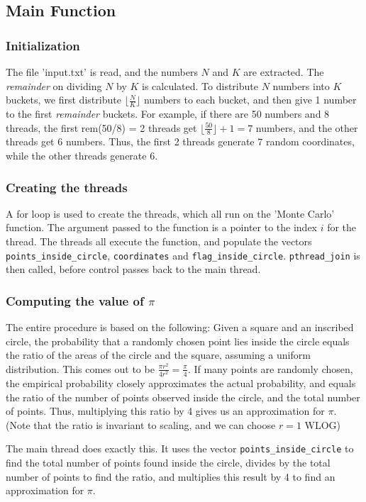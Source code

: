 \documentclass[12pt]{article}
\begin{document}
\subsection{Main Function}
\subsubsection{Initialization}
The file 'input.txt' is read, and the numbers $N$ and $K$ are extracted. The \emph{remainder} on dividing $N$ by $K$ is calculated.
To distribute $N$ numbers into $K$ buckets, we first distribute $\lfloor \frac{N}{K} \rfloor$ numbers to each bucket, and then give 1 number to the first
\emph{remainder} buckets. For example, if there are 50 numbers and 8 threads, the first rem(50/8) = 2 threads get $\lfloor \frac{50}{8} \rfloor + 1 = 7$ numbers, and
the other threads get $6$ numbers. Thus, the first 2 threads generate $7$ random coordinates, while the other threads generate $6$.
\subsubsection{Creating the threads}
A for loop is used to create the threads, which all run on the 'Monte Carlo' function. The argument passed to the function is a pointer to the index $i$ for the thread. The threads all execute the function,
and populate the vectors \texttt{points\_inside\_circle}, \texttt{coordinates} and \texttt{flag\_inside\_circle}. \texttt{pthread\_join} is then called, before control passes back to the main thread.


\subsubsection{Computing the value of $\pi$}
The entire procedure is based on the following: Given a square and an inscribed circle, the probability that a randomly chosen point lies inside the circle equals the ratio of the areas of the circle and the square,
assuming a uniform distribution. This comes out to be $\frac{\pi r^2}{4r^2} = \frac{\pi}{4}$. If many points are randomly chosen, the empirical probability closely approximates the actual probability, and equals the ratio of
the number of points observed inside the circle, and the total number of points. Thus, multiplying this ratio by 4 gives us an approximation for $\pi$. (Note that the ratio is invariant to scaling, and we can choose $r=1$ WLOG)

\noindent The main thread does exactly this. It uses the vector \texttt{points\_inside\_circle} to find the total number of points found inside the circle, divides by the total number of points to find the ratio, and multiplies this result by 4 to find an approximation
for $\pi$.
\end{document}
